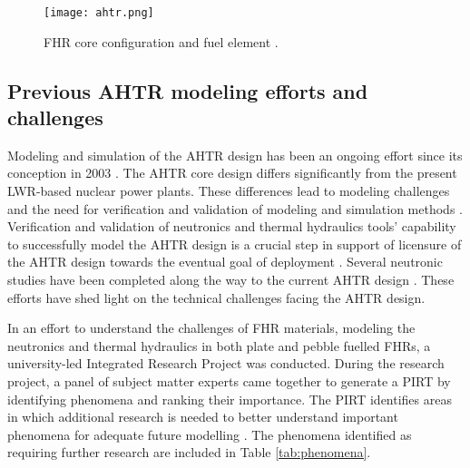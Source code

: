 \begin{figure}[H]
    \centering
    \texttt{[image: ahtr.png]} 
    \caption{FHR core configuration and fuel element \cite{ramey_monte_2018}.}
    \label{fig:ahtr}
\end{figure}

\subsection{Previous AHTR modeling efforts and challenges}
Modeling and simulation of the \gls{AHTR} design has been an ongoing effort 
since its conception in 2003 \cite{forsberg_molten-salt-cooled_2003}. 
The \gls{AHTR} core design differs significantly from the present \gls{LWR}-based 
nuclear power plants. 
These differences lead to modeling challenges and the need for verification and 
validation of modeling and simulation methods \cite{ramey_monte_2018}. 
Verification and validation of neutronics and thermal hydraulics tools' 
capability to successfully model the \gls{AHTR} design is a crucial step 
in support of licensure of the \gls{AHTR} design towards the eventual goal 
of deployment \cite{rahnema_phenomena_2019,rahnema_current_2015}. 
Several neutronic studies have been completed along the way to the current 
\gls{AHTR} design \cite{ramey_monte_2018,holcomb_fluoride_2013,greene_pre-conceptual_2010}. 
These efforts have shed light on the technical challenges facing the \gls{AHTR} design. 

In an effort to understand the challenges of \gls{FHR} materials, 
modeling the neutronics and thermal hydraulics in 
both plate and pebble fuelled \glspl{FHR}, a university-led Integrated 
Research Project \cite{zhang_integrated_2019} was conducted. 
During the research project, a panel of subject matter experts came together to 
generate a \gls{PIRT} by identifying phenomena and ranking their importance.
The \gls{PIRT} identifies areas in which additional research is needed to better 
understand important phenomena for adequate future modelling 
\cite{rahnema_phenomena_2019}. 
The phenomena identified as requiring further research are included in 
Table \ref{tab:phenomena}. 

